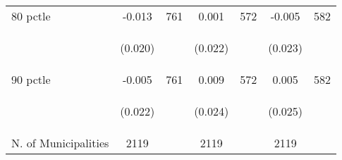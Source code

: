 \begin{tabular}{lcccccc}
80 pctle   &  -0.013   &  761  &   0.001  &  572 &  -0.005  &  582   \\

\vspace{4pt} &  \begin{footnotesize}(0.020)\end{footnotesize}   & &
			    \begin{footnotesize}(0.022)\end{footnotesize}   & &
			    \begin{footnotesize}(0.023)\end{footnotesize}   &
			     \\          

90 pctle   &  -0.005   &  761  &   0.009  &  572 &  0.005  &  582   \\

\vspace{4pt} &  \begin{footnotesize}(0.022)\end{footnotesize}   & &
			    \begin{footnotesize}(0.024)\end{footnotesize}   & &
			    \begin{footnotesize}(0.025)\end{footnotesize}   &
			     \\          


N. of Municipalities   &   2119   & &    2119 &    &  2119  &   \\
\hline	


\end{tabular}%
